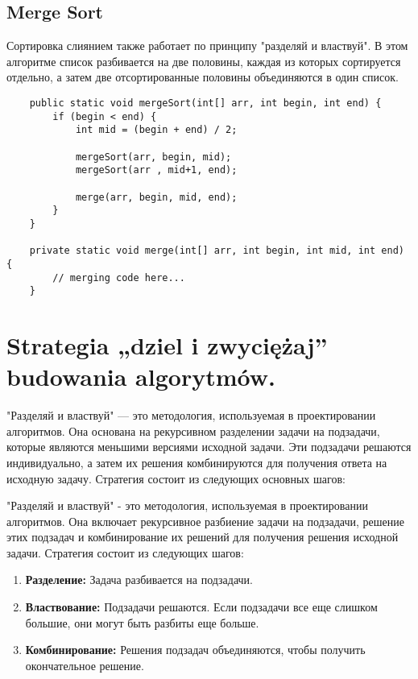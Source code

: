\subsection*{Merge Sort}

Сортировка слиянием также работает по принципу "разделяй и властвуй". В этом алгоритме список разбивается на две половины, каждая из которых сортируется отдельно, а затем две отсортированные половины объединяются в один список.


\begin{lstlisting}
    public static void mergeSort(int[] arr, int begin, int end) {
        if (begin < end) {
            int mid = (begin + end) / 2;
    
            mergeSort(arr, begin, mid);
            mergeSort(arr , mid+1, end);
    
            merge(arr, begin, mid, end);
        }
    }
    
    private static void merge(int[] arr, int begin, int mid, int end) {
        // merging code here...
    }
    \end{lstlisting}

\section{Strategia „dziel i zwyciężaj” budowania algorytmów.}


"Разделяй и властвуй" — это методология, используемая в проектировании алгоритмов. Она основана на рекурсивном разделении задачи на подзадачи, которые являются меньшими версиями исходной задачи. Эти подзадачи решаются индивидуально, а затем их решения комбинируются для получения ответа на исходную задачу. Стратегия состоит из следующих основных шагов:

"Разделяй и властвуй" - это методология, используемая в проектировании алгоритмов. Она включает рекурсивное разбиение задачи на подзадачи, решение этих подзадач и комбинирование их решений для получения решения исходной задачи. Стратегия состоит из следующих шагов:

\begin{enumerate}
\item \textbf{Разделение:} Задача разбивается на подзадачи.
\item \textbf{Властвование:} Подзадачи решаются. Если подзадачи все еще слишком большие, они могут быть разбиты еще больше.
\item \textbf{Комбинирование:} Решения подзадач объединяются, чтобы получить окончательное решение.
\end{enumerate}

